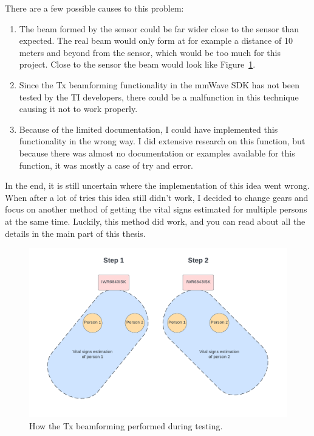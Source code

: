 There are a few possible causes to this problem:

\begin{enumerate}
    \item The beam formed by the sensor could be far wider close to the sensor than expected. The real beam would only form at for example a distance of 10 meters and beyond from the sensor, which would be too much for this project. Close to the sensor the beam would look like Figure~\ref{fig:tx_beam_real_life}.
    \item Since the Tx beamforming functionality in the mmWave SDK has not been tested by the TI developers, there could be a malfunction in this technique causing it not to work properly.
    \item Because of the limited documentation, I could have implemented this functionality in the wrong way. I did extensive research on this function, but because there was almost no documentation or examples available for this function, it was mostly a case of try and error.
\end{enumerate}

In the end, it is still uncertain where the implementation of this idea went wrong. When after a lot of tries this idea still didn't work, I decided to change gears and focus on another method of getting the vital signs estimated for multiple persons at the same time. Luckily, this method did work, and you can read about all the details in the main part of this thesis.

\begin{figure}[t]
    \centering
    \includegraphics[width=.95\textwidth]{figures/appendix/tx_beamforming_real_life2.pdf}
    \caption{How the Tx beamforming performed during testing.}
    \label{fig:tx_beam_real_life}
\end{figure}